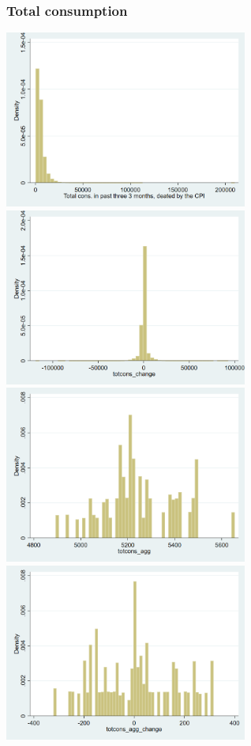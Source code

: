 \documentclass[12pt,a4paper]{article}
\begin{document}
\subsubsection*{Total consumption}
\begin{center}
\includegraphics[width=8cm]{graphs/totcons.png}
\includegraphics[width=8cm]{graphs/totcons_change.png}\\
\includegraphics[width=8cm]{graphs/totcons_agg.png}
\includegraphics[width=8cm]{graphs/totcons_agg_change.png}\\

\end{center}
\end{document}
